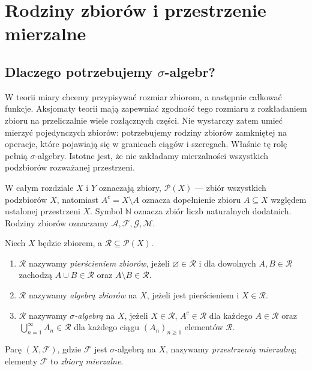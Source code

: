 \chapter{Rodziny zbiorów i przestrzenie mierzalne}

\providecommand{\atlasref}[2]{#2}

\label{ch:przestrzenie-mierzalne}

\section{Dlaczego potrzebujemy \texorpdfstring{$\sigma$}{sigma}-algebr?}

W teorii miary chcemy przypisywać rozmiar zbiorom, a następnie całkować funkcje.
Aksjomaty teorii mają zapewniać zgodność tego rozmiaru z rozkładaniem zbioru
na przeliczalnie wiele rozłącznych części. Nie wystarczy zatem umieć mierzyć
pojedynczych zbiorów: potrzebujemy rodziny zbiorów zamkniętej na operacje,
które pojawiają się w granicach ciągów i szeregach. Właśnie tę rolę pełnią
$\sigma$-algebry. Istotne jest, że nie zakładamy mierzalności wszystkich
podzbiorów rozważanej przestrzeni.

W całym rozdziale $X$ i $Y$ oznaczają zbiory, $\mathcal P(X)$ --- zbiór
wszystkich podzbiorów $X$, natomiast $A^c=X\setminus A$ oznacza dopełnienie
zbioru $A\subseteq X$ względem ustalonej przestrzeni $X$. Symbol $\mathbb N$
oznacza zbiór liczb naturalnych dodatnich. Rodziny zbiorów oznaczamy
$\mathcal A,\mathcal F,\mathcal G,\mathcal M$.

\begin{definicja}
\label{def:algebry}
Niech $X$ będzie zbiorem, a $\mathcal R\subseteq\mathcal P(X)$.
\begin{enumerate}
\item $\mathcal R$ nazywamy \emph{pierścieniem zbiorów}, jeżeli
$\varnothing\in\mathcal R$ i dla dowolnych $A,B\in\mathcal R$ zachodzą
$A\cup B\in\mathcal R$ oraz $A\setminus B\in\mathcal R$.
\item $\mathcal R$ nazywamy \emph{algebrą zbiorów} na $X$, jeżeli jest
pierścieniem i $X\in\mathcal R$.
\item $\mathcal R$ nazywamy \emph{$\sigma$-algebrą} na $X$, jeżeli
$X\in\mathcal R$, $A^c\in\mathcal R$ dla każdego $A\in\mathcal R$ oraz
$\bigcup_{n=1}^{\infty}A_n\in\mathcal R$ dla każdego ciągu
$(A_n)_{n\geq1}$ elementów $\mathcal R$.
\end{enumerate}
Parę $(X,\mathcal F)$, gdzie $\mathcal F$ jest $\sigma$-algebrą na $X$,
nazywamy \emph{przestrzenią mierzalną}; elementy $\mathcal F$ to \emph{zbiory
mierzalne}.
\end{definicja}

